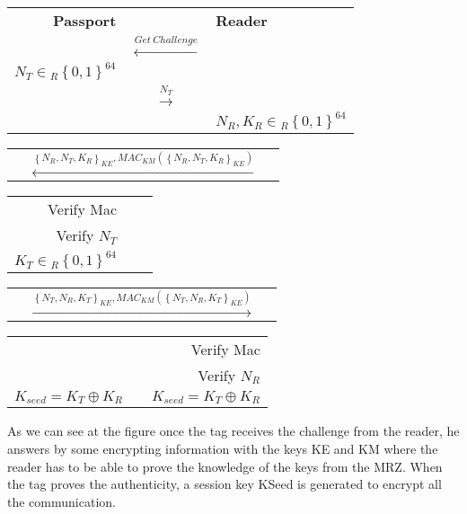 \documentclass{acm_proc_article-sp}
\begin{document}

\begin{center}
	\begin{tabular}{p{3.8cm}cp{4.5cm}}
		\multicolumn{1}{r}{\textbf{Passport}} & &
        \multicolumn{1}{l}{\textbf{Reader}}\\ 	
        &$\xleftarrow{ Get\ Challenge }$& \\
		\multicolumn{1}{r}{$N_T \in{_R \left\{{0,1}\right\}}^{64}$} & & \\               
		&$\xrightarrow{ N_T }$& \\
		
        &&\multicolumn{1}{l}{$N_R,K_R \in{_R \left\{{0,1}\right\}}^{64}$}\\ 
    \end{tabular}
	\begin{tabular}{p{2.5cm}cp{3cm}}
		&$\xleftarrow{\left\{{N_R,N_T,K_R}\right\}_{KE},MAC_{KM}(\left\{{N_R,N_T,K_R}\right\}_{KE})}$& \\
	\end{tabular}
	\begin{tabular}{p{3.8cm}cp{1.5cm}}
		\multicolumn{1}{r}{Verify Mac} & & \\
		\multicolumn{1}{r}{Verify $N_T$} & & \\				
		\multicolumn{1}{r}{$K_T \in{_R \left\{{0,1}\right\}}^{64}$} & & \\               		
	\end{tabular}
	\begin{tabular}{p{2.5cm}cp{3cm}}		
		&$\xrightarrow{\left\{{N_T,N_R,K_T}\right\}_{KE},MAC_{KM}(\left\{{N_T,N_R,K_T}\right\}_{KE})}$& \\
	\end{tabular}
	\begin{tabular}{p{3.8cm}cp{4.5cm}}
		&&\multicolumn{1}{r}{Verify Mac}\\
		&&\multicolumn{1}{r}{Verify $N_R$}\\
		\multicolumn{1}{r}{$K_{seed} = K_T\oplus{}K_R $} & &
        \multicolumn{1}{l}{$K_{seed} = K_T\oplus{}K_R $}\\		
	\end{tabular}
\end{center}


As we can see at the figure 
once the tag receives the challenge from the reader, he answers 
by some encrypting information with the keys KE and KM where the reader has to be able to prove the 
knowledge of the keys from the MRZ. When the tag proves the authenticity, a session key KSeed 
is generated to encrypt all the communication.
\end{document}
